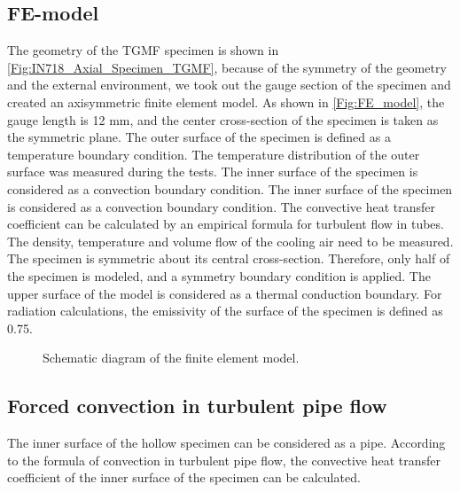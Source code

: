 \documentclass[preprint,5p,twocolumn,11pt,sort&compress]{elsarticle}
\begin{document}
\subsection{FE-model}
\noindent
The geometry of the TGMF specimen is shown in \autoref{Fig:IN718_Axial_Specimen_TGMF}, because of the symmetry of the geometry and the external environment, we took out the gauge section of the specimen and created an axisymmetric finite element model. As shown in \autoref{Fig:FE_model}, the gauge length is 12 mm, and the center cross-section of the specimen is taken as the symmetric plane.
The outer surface of the specimen is defined as a temperature boundary condition. The temperature distribution of the outer surface was measured during the tests. The inner surface of the specimen is considered as a convection boundary condition. The inner surface of the specimen is considered as a convection boundary condition. The convective heat transfer coefficient can be calculated by an empirical formula for turbulent flow in tubes. The density, temperature and volume flow of the cooling air need to be measured. The specimen is symmetric about its central cross-section. Therefore, only half of the specimen is modeled, and a symmetry boundary condition is applied.
The upper surface of the model is considered as a thermal conduction boundary. For radiation calculations, the emissivity of the surface of the specimen is defined as 0.75.

\begin{figure}[!htp]
  \caption{Schematic diagram of the finite element model.}
  \label{Fig:FE_model}
\end{figure}

\subsection{Forced convection in turbulent pipe flow}
The inner surface of the hollow specimen can be considered as a pipe.
According to the formula of convection in turbulent pipe flow, the convective heat transfer coefficient of the inner surface of the specimen can be calculated.
\end{document}
